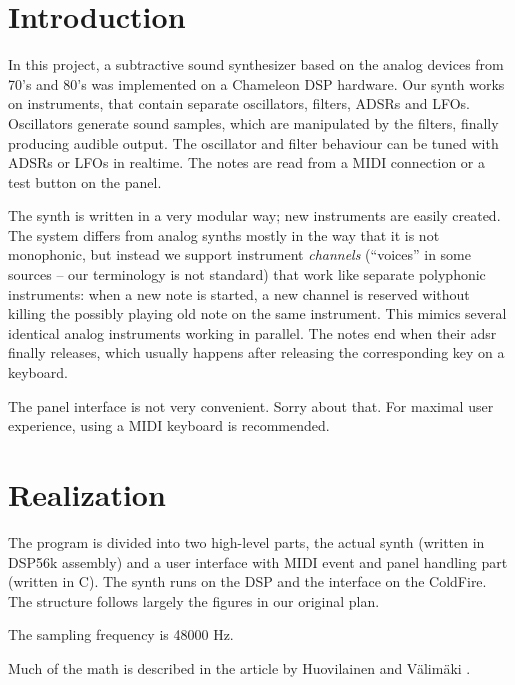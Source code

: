\documentclass[10pt,a4paper,oneside]{article}
\begin{document}
\maketitle

\section{Introduction}

In this project, a subtractive sound synthesizer based on the analog devices from 70's and 80's \cite{nostalgiaa} was implemented on a Chameleon DSP hardware. Our synth works on instruments, that contain separate oscillators, filters, ADSRs and LFOs. Oscillators generate sound samples, which are manipulated by the filters, finally producing audible output. The oscillator and filter behaviour can be tuned with ADSRs or LFOs in realtime. The notes are read from a MIDI connection or a test button on the panel.

The synth is written in a very modular way; new instruments are easily created. The system differs from analog synths mostly in the way that it is not monophonic, but instead we support instrument \emph{channels} (``voices'' in some sources -- our terminology is not standard) that work like separate polyphonic instruments: when a new note is started, a new channel is reserved without killing the possibly playing old note on the same instrument. This mimics several identical analog instruments working in parallel. The notes end when their adsr finally releases, which usually happens after releasing the corresponding key on a keyboard.

The panel interface is not very convenient. Sorry about that. For maximal user experience, using a MIDI keyboard is recommended.


\section{Realization}

The program is divided into two high-level parts, the actual synth (written in DSP56k assembly) and a user interface with MIDI event and panel handling part (written in C). The synth runs on the DSP and the interface on the ColdFire. The structure follows largely the figures in our original plan.

The sampling frequency is 48000 Hz.

Much of the math is described in the article by Huovilainen and Välimäki \cite{algos}.
\end{document}
